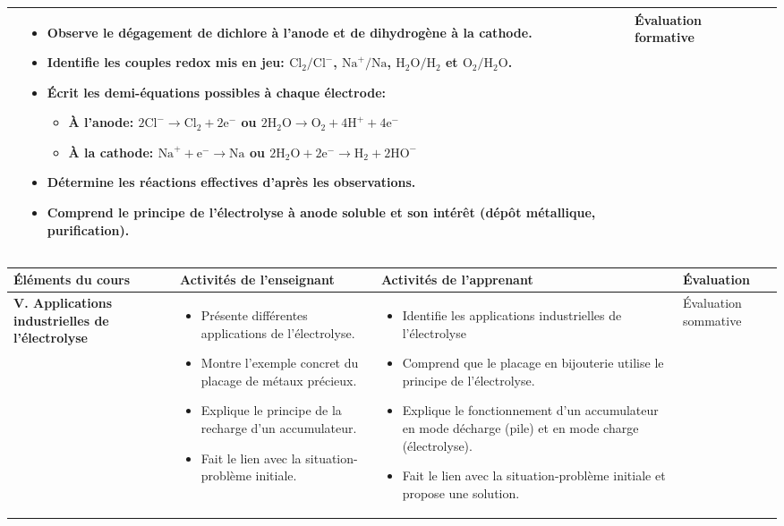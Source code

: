 \documentclass[12pt]{article}
\begin{document}
\begin{tabularx}{\textwidth}{|p{3.5cm}|X|X|p{2.5cm}|}
\begin{itemize}[leftmargin=*]
\end{itemize} & 
\begin{itemize}[leftmargin=*]
      \item Observe le dégagement de dichlore à l'anode et de dihydrogène à la cathode.
    \item Identifie les couples redox mis en jeu: $\text{Cl}_2/\text{Cl}^-$, $\text{Na}^+/\text{Na}$, $\text{H}_2\text{O}/\text{H}_2$ et $\text{O}_2/\text{H}_2\text{O}$.
    \item Écrit les demi-équations possibles à chaque électrode:
    \begin{itemize}
        \item À l'anode: $2\text{Cl}^- \rightarrow \text{Cl}_2 + 2\text{e}^-$ ou $2\text{H}_2\text{O} \rightarrow \text{O}_2 + 4\text{H}^+ + 4\text{e}^-$
        \item À la cathode: $\text{Na}^+ + \text{e}^- \rightarrow \text{Na}$ ou $2\text{H}_2\text{O} + 2\text{e}^- \rightarrow \text{H}_2 + 2\text{HO}^-$
    \end{itemize}
    \item Détermine les réactions effectives d'après les observations.
    \item Comprend le principe de l'électrolyse à anode soluble et son intérêt (dépôt métallique, purification).
\end{itemize}
& 
Évaluation formative \\
\hline

\end{tabularx}
\begin{tabularx}{\textwidth}{|p{3.5cm}|X|X|p{2.5cm}|}
\hline
\rowcolor{lightgray}
\textbf{Éléments du cours} & \textbf{Activités de l'enseignant} & \textbf{Activités de l'apprenant} & \textbf{Évaluation} \\
\hline\hline


\textbf{V. Applications industrielles de l'électrolyse} & 
\begin{itemize}[leftmargin=*]
       \item Présente différentes applications de l'électrolyse.
    \item Montre l'exemple concret du placage de métaux précieux.
    \item Explique le principe de la recharge d'un accumulateur.
    \item Fait le lien avec la situation-problème initiale.
\end{itemize} & 
\begin{itemize}[leftmargin=*]
       \item Identifie les applications industrielles de l'électrolyse
    \item Comprend que le placage en bijouterie utilise le principe de l'électrolyse.
    \item Explique le fonctionnement d'un accumulateur en mode décharge (pile) et en mode charge (électrolyse).
    \item Fait le lien avec la situation-problème initiale et propose une solution.
\end{itemize} & 
Évaluation sommative \\
\hline
\end{tabularx}
\end{document}
